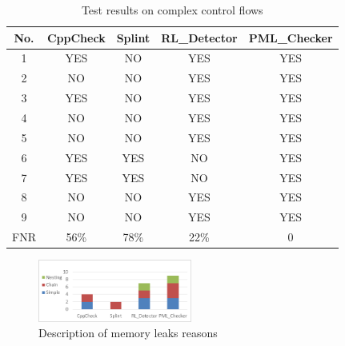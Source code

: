 \begin{table}[!h]
\center
\caption{Test results on complex control flows}\label{tab:2}
\begin{tabular}{|c|c|c|c|c|}
\hline
\textbf{No.}  & \textbf{CppCheck} & \textbf{Splint} & \textbf{RL\_Detector} & \textbf{PML\_Checker}\\
\hline
1	 &	YES & NO & YES & YES\\
\hline
2	 & NO &	NO & YES & YES\\
\hline
3		& YES &	NO & YES & YES\\
\hline
4	 & NO & NO & YES & YES\\
\hline
5	 &	NO	& NO & YES & YES\\
\hline
6	 & YES & YES & NO & YES\\
\hline
7	 & YES& YES & NO & YES\\
\hline
8	 & NO & NO & YES & YES\\
\hline
9 & NO & NO & YES & YES\\
\hline
FNR & 56\% & 78\% & 22\% & 0\\
\hline
\end{tabular}
\end{table}

\begin{figure}
\center
\includegraphics[width=0.45\textwidth]{figure/fig8-fig12/fig8}
\caption{Description of memory leaks reasons}
\label{fig:8}
\end{figure}



